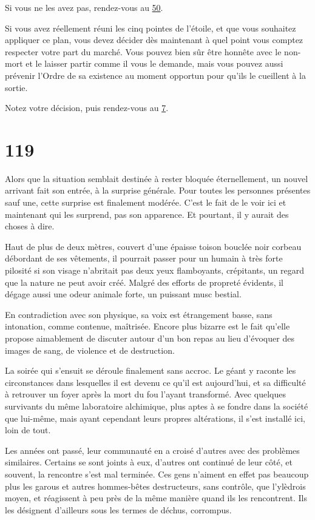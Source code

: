 \documentclass{report}
\newcommand{\gsection}[1]{
    \section{#1}
    \label{section-#1}
}
\newcommand{\glink}[1]{\hyperref[section-#1]{#1}}
\begin{document}
Si vous ne les avez pas, rendez-vous au \glink{50}.

Si vous avez réellement réuni les cinq pointes de l'étoile, et que vous souhaitez appliquer ce plan, vous devez décider dès maintenant à quel point vous comptez respecter votre part du marché. Vous pouvez bien sûr être honnête avec le non-mort et le laisser partir comme il vous le demande, mais vous pouvez aussi prévenir l'Ordre de sa existence au moment opportun pour qu'ils le cueillent à la sortie.

Notez votre décision, puis rendez-vous au \glink{7}.

\gsection{119}

Alors que la situation semblait destinée à rester bloquée éternellement, un nouvel arrivant fait son entrée, à la surprise générale. Pour toutes les personnes présentes sauf une, cette surprise est finalement modérée. C'est le fait de le voir ici et maintenant qui les surprend, pas son apparence. Et pourtant, il y aurait des choses à dire.

Haut de plus de deux mètres, couvert d'une épaisse toison bouclée noir corbeau débordant de ses vêtements, il pourrait passer pour un humain à très forte pilosité si son visage n'abritait pas deux yeux flamboyants, crépitants, un regard que la nature ne peut avoir créé. Malgré des efforts de propreté évidents, il dégage aussi une odeur animale forte, un puissant musc bestial.

En contradiction avec son physique, sa voix est étrangement basse, sans intonation, comme contenue, maîtrisée. Encore plus bizarre est le fait qu'elle propose aimablement de discuter autour d'un bon repas au lieu d'évoquer des images de sang, de violence et de destruction.

La soirée qui s'ensuit se déroule finalement sans accroc. Le géant y raconte les circonstances dans lesquelles il est devenu ce qu'il est aujourd'hui, et sa difficulté à retrouver un foyer après la mort du fou l'ayant transformé. Avec quelques survivants du même laboratoire alchimique, plus aptes à se fondre dans la société que lui-même, mais ayant cependant leurs propres altérations, il s'est installé ici, loin de tout.

Les années ont passé, leur communauté en a croisé d'autres avec des problèmes similaires. Certains se sont joints à eux, d'autres ont continué de leur côté, et souvent, la rencontre s'est mal terminée. Ces gens n'aiment en effet pas beaucoup plus les garous et autres hommes-bêtes destructeurs, sans contrôle, que l'ylèdrois moyen, et réagissent à peu près de la même manière quand ils les rencontrent. Ils les désignent d'ailleurs sous les termes de déchus, corrompus.
\end{document}
